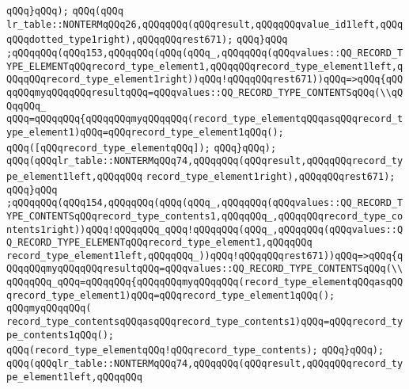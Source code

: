 \verb|qQQq}qQQq);|\newline
\verb|qQQq(qQQq|\newline
\verb|lr_table::NONTERMqQQq26,qQQqqQQq(qQQqresult,qQQqqQQqvalue_id1left,qQQqqQQqdotted_type1right),qQQqqQQqrest671);|\newline
\verb|qQQq}qQQq|\newline
\verb|;qQQqqQQq(qQQq153,qQQqqQQq(qQQq(qQQq_,qQQqqQQq(qQQqvalues::QQ_RECORD_TYPE_ELEMENTqQQqrecord_type_element1,qQQqqQQqrecord_type_element1left,qQQqqQQqrecord_type_element1right))qQQq!qQQqqQQqrest671))qQQq=>qQQq{qQQqqQQqmyqQQqqQQqresultqQQq=qQQqvalues::QQ_RECORD_TYPE_CONTENTSqQQq(\\qQQqqQQq_|\newline
\verb|qQQq=qQQqqQQq{qQQqqQQqmyqQQqqQQq(record_type_elementqQQqasqQQqrecord_type_element1)qQQq=qQQqrecord_type_element1qQQq();|\newline
\verb|qQQq([qQQqrecord_type_elementqQQq]);|\newline
\verb|qQQq}qQQq);|\newline
\verb|qQQq(qQQqlr_table::NONTERMqQQq74,qQQqqQQq(qQQqresult,qQQqqQQqrecord_type_element1left,qQQqqQQq|\newline
\verb|record_type_element1right),qQQqqQQqrest671);|\newline
\verb|qQQq}qQQq|\newline
\verb|;qQQqqQQq(qQQq154,qQQqqQQq(qQQq(qQQq_,qQQqqQQq(qQQqvalues::QQ_RECORD_TYPE_CONTENTSqQQqrecord_type_contents1,qQQqqQQq_,qQQqqQQqrecord_type_contents1right))qQQq!qQQqqQQq_qQQq!qQQqqQQq(qQQq_,qQQqqQQq(qQQqvalues::QQ_RECORD_TYPE_ELEMENTqQQqrecord_type_element1,qQQqqQQq|\newline
\verb|record_type_element1left,qQQqqQQq_))qQQq!qQQqqQQqrest671))qQQq=>qQQq{qQQqqQQqmyqQQqqQQqresultqQQq=qQQqvalues::QQ_RECORD_TYPE_CONTENTSqQQq(\\qQQqqQQq_qQQq=qQQqqQQq{qQQqqQQqmyqQQqqQQq(record_type_elementqQQqasqQQqrecord_type_element1)qQQq=qQQqrecord_type_element1qQQq();|\newline
\verb|qQQqmyqQQqqQQq(|\newline
\verb|record_type_contentsqQQqasqQQqrecord_type_contents1)qQQq=qQQqrecord_type_contents1qQQq();|\newline
\verb|qQQq(record_type_elementqQQq!qQQqrecord_type_contents);|\newline
\verb|qQQq}qQQq);|\newline
\verb|qQQq(qQQqlr_table::NONTERMqQQq74,qQQqqQQq(qQQqresult,qQQqqQQqrecord_type_element1left,qQQqqQQq|\newline
